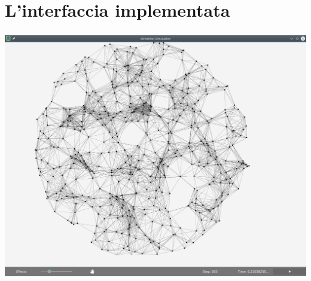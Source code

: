 \documentclass[%
]{beamer}
\begin{document}
    \section{L'interfaccia implementata}\label{sec:new}


    \begin{frame}
        \frametitle{\insertsection}
        \centering
        \includegraphics[scale=0.27]{img/new/window_all}
    \end{frame}
\end{document}
